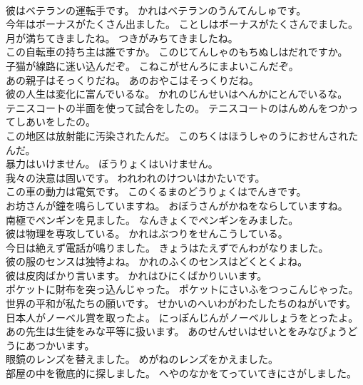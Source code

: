\documentclass[8pt]{extreport}
\begin{document}
\begin{CJK}{UTF8}{min}
\\	彼はベテランの運転手です。	かれはベテランのうんてんしゅです。 
\\	今年はボーナスがたくさん出ました。	ことしはボーナスがたくさんでました。 
\\	月が満ちてきましたね。	つきがみちてきましたね。 
\\	この自転車の持ち主は誰ですか。	このじてんしゃのもちぬしはだれですか。 
\\	子猫が線路に迷い込んだぞ。	こねこがせんろにまよいこんだぞ。 
\\	あの親子はそっくりだね。	あのおやこはそっくりだね。 
\\	彼の人生は変化に富んでいるな。	かれのじんせいはへんかにとんでいるな。 
\\	テニスコートの半面を使って試合をしたの。	テニスコートのはんめんをつかってしあいをしたの。 
\\	この地区は放射能に汚染されたんだ。	このちくはほうしゃのうにおせんされたんだ。 
\\	暴力はいけません。	ぼうりょくはいけません。 
\\	我々の決意は固いです。	われわれのけついはかたいです。 
\\	この車の動力は電気です。	このくるまのどうりょくはでんきです。 
\\	お坊さんが鐘を鳴らしていますね。	おぼうさんがかねをならしていますね。 
\\	南極でペンギンを見ました。	なんきょくでペンギンをみました。 
\\	彼は物理を専攻している。	かれはぶつりをせんこうしている。 
\\	今日は絶えず電話が鳴りました。	きょうはたえずでんわがなりました。 
\\	彼の服のセンスは独特よね。	かれのふくのセンスはどくとくよね。 
\\	彼は皮肉ばかり言います。	かれはひにくばかりいいます。 
\\	ポケットに財布を突っ込んじゃった。	ポケットにさいふをつっこんじゃった。 
\\	世界の平和が私たちの願いです。	せかいのへいわがわたしたちのねがいです。 
\\	日本人がノーベル賞を取ったよ。	にっぽんじんがノーベルしょうをとったよ。 
\\	あの先生は生徒をみな平等に扱います。	あのせんせいはせいとをみなびょうどうにあつかいます。 
\\	眼鏡のレンズを替えました。	めがねのレンズをかえました。 
\\	部屋の中を徹底的に探しました。	へやのなかをてっていてきにさがしました。 

\end{CJK}
\end{document}

